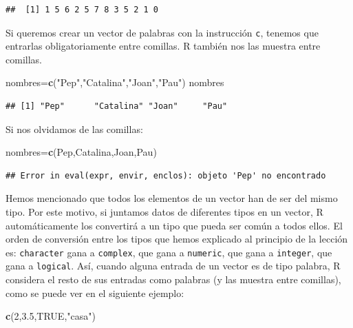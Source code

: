 \documentclass[]{book}
\newenvironment{Shaded}{\begin{snugshade}}{\end{snugshade}}
\newcommand{\DecValTok}[1]{\textcolor[rgb]{0.00,0.00,0.81}{#1}}
\newcommand{\FloatTok}[1]{\textcolor[rgb]{0.00,0.00,0.81}{#1}}
\newcommand{\KeywordTok}[1]{\textcolor[rgb]{0.13,0.29,0.53}{\textbf{#1}}}
\newcommand{\NormalTok}[1]{#1}
\newcommand{\OtherTok}[1]{\textcolor[rgb]{0.56,0.35,0.01}{#1}}
\newcommand{\StringTok}[1]{\textcolor[rgb]{0.31,0.60,0.02}{#1}}
\theoremstyle{definition}
\theoremstyle{definition}
\theoremstyle{definition}
\theoremstyle{remark}
\begin{document}
\begin{verbatim}
##  [1] 1 5 6 2 5 7 8 3 5 2 1 0
\end{verbatim}

Si queremos crear un vector de palabras con la instrucción \texttt{c}, tenemos que entrarlas obligatoriamente entre comillas. R también nos las muestra entre comillas.

\begin{Shaded}
\begin{Highlighting}[]
\NormalTok{nombres=}\KeywordTok{c}\NormalTok{(}\StringTok{"Pep"}\NormalTok{,}\StringTok{"Catalina"}\NormalTok{,}\StringTok{"Joan"}\NormalTok{,}\StringTok{"Pau"}\NormalTok{)}
\NormalTok{nombres}
\end{Highlighting}
\end{Shaded}

\begin{verbatim}
## [1] "Pep"      "Catalina" "Joan"     "Pau"
\end{verbatim}

Si nos olvidamos de las comillas:

\begin{Shaded}
\begin{Highlighting}[]
\NormalTok{nombres=}\KeywordTok{c}\NormalTok{(Pep,Catalina,Joan,Pau)}
\end{Highlighting}
\end{Shaded}

\begin{verbatim}
## Error in eval(expr, envir, enclos): objeto 'Pep' no encontrado
\end{verbatim}

Hemos mencionado que todos los elementos de un vector han de ser del mismo tipo. Por este motivo, si juntamos datos de diferentes tipos en un vector, R automáticamente los convertirá a un tipo que pueda ser común a todos ellos. El orden de conversión entre los tipos que hemos explicado al principio de la lección es: \texttt{character} gana a \texttt{complex}, que gana a \texttt{numeric}, que gana a \texttt{integer}, que gana a \texttt{logical}. Así, cuando alguna entrada de un vector es de tipo palabra, R considera el resto de sus entradas como palabras (y las muestra entre comillas), como se puede ver en el siguiente ejemplo:

\begin{Shaded}
\begin{Highlighting}[]
\KeywordTok{c}\NormalTok{(}\DecValTok{2}\NormalTok{,}\FloatTok{3.5}\NormalTok{,}\OtherTok{TRUE}\NormalTok{,}\StringTok{"casa"}\NormalTok{)}
\end{Highlighting}
\end{Shaded}
\end{document}
